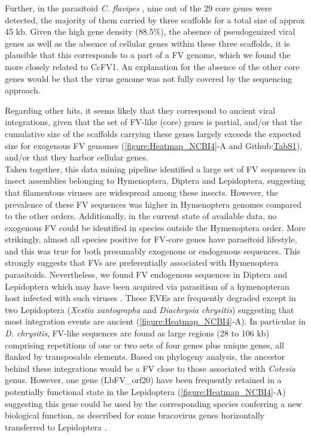 Further, in the parasitoid \textit{C. flavipes} \citep{gauthier_chromosomal_2021}, nine out of the 29 core genes were detected, the majority of them carried by three scaffolds for a total size of approx 45 kb. Given the high gene density (88.5\%), the absence of pseudogenized viral genes as well as the absence of cellular genes within these three scaffolds, it is plausible that this corresponds to a part of a FV genome, which we found the more closely related to CcFV1. An explanation for the absence of the other core genes would be that the virus genome was not fully covered by the sequencing approach. 

Regarding other hits, it seems likely that they correspond to ancient viral integrations, given that the set of FV-like (core) genes is partial, and/or that the cumulative size of the scaffolds carrying these genes largely exceeds the expected size for exogenous FV genomes (\figurename{\ref{figure:Heatmap_NCBI4}}-A and Github:\href{https://github.com/BenjaminGuinet/PhD_defense/blob/main/Supplementary_paper2/Table%20S1.docx}{TabS1}), and/or that they harbor cellular genes.  \\

Taken together, this data mining pipeline identified a large set of FV sequences in insect assemblies belonging to Hymenoptera, Diptera and Lepidoptera, suggesting that filamentous viruses are  widespread among these insects. However, the prevalence of these FV sequences was higher in Hymenoptera genomes compared to the other orders. Additionally, in the current state of available data, no exogenous FV could be identified in species outside the Hymenoptera order. More strikingly, almost all species positive for FV-core genes have parasitoid lifestyle, and this was true for both presumably exogenous or endogenous sequences. This strongly suggests that FVs are preferentially associated with Hymenoptera parasitoids. Nevertheless, we found FV endogenous sequences in Diptera and Lepidoptera which may have been acquired via parasitism of a hymenopteran host infected with such viruses \citep{muller_genome-wide_2021}. These EVEs are frequently degraded except in two Lepidoptera (\textit{Xestia xantographa} and \textit{Diachrysia chrysitis}) suggesting that most integration events are ancient (\figurename{\ref{figure:Heatmap_NCBI4}}-A). In particular in \textit{D. chrysitis}, FV-like sequences are found as large regions (28 to 106 kb) comprising repetitions of one or two sets of four genes plus unique genes, all flanked by transposable elements. Based on phylogeny analysis, the ancestor behind these integrations would be a FV close to those associated with \textit{Cotesia} genus. However, one gene (LbFV\_orf20) have been frequently retained in a potentially functional state in the Lepidoptera (\figurename{\ref{figure:Heatmap_NCBI4}}-A) suggesting this gene could be used by the corresponding species conferring a new biological function, as described for some bracovirus genes horizontally transferred to Lepidoptera \citep{gasmi_recurrent_2015,di_lelio_evolution_2019}.


